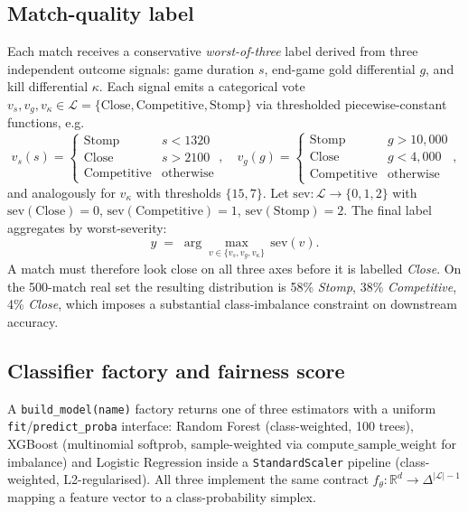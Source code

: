 \documentclass{article}
\begin{document}
\subsection{Match-quality label}
\label{sec:labels}
Each match receives a conservative \emph{worst-of-three} label derived from
three independent outcome signals: game duration $s$, end-game gold
differential $g$, and kill differential $\kappa$. Each signal emits a
categorical vote $v_s, v_g, v_\kappa \in \mathcal{L} =
\{\text{Close}, \text{Competitive}, \text{Stomp}\}$ via thresholded
piecewise-constant functions, e.g.
\begin{equation}
v_s(s) = \begin{cases}
\text{Stomp} & s < 1320 \\
\text{Close} & s > 2100 \\
\text{Competitive} & \text{otherwise}
\end{cases},
\quad
v_g(g) = \begin{cases}
\text{Stomp} & g > 10{,}000 \\
\text{Close} & g < 4{,}000 \\
\text{Competitive} & \text{otherwise}
\end{cases},
\label{eq:votes}
\end{equation}
and analogously for $v_\kappa$ with thresholds $\{15, 7\}$. Let
$\text{sev}: \mathcal{L} \to \{0,1,2\}$ with
$\text{sev}(\text{Close})=0$, $\text{sev}(\text{Competitive})=1$,
$\text{sev}(\text{Stomp})=2$. The final label aggregates by
worst-severity:
\begin{equation}
y \;=\; \arg\max_{v \in \{v_s, v_g, v_\kappa\}}\, \text{sev}(v).
\label{eq:label}
\end{equation}
A match must therefore look close on all three axes before it is labelled
\emph{Close}. On the 500-match real set the resulting distribution is 58\%
\emph{Stomp}, 38\% \emph{Competitive}, 4\% \emph{Close}, which imposes a
substantial class-imbalance constraint on downstream accuracy.

\subsection{Classifier factory and fairness score}
\label{sec:classifier}
A \texttt{build\_model(name)} factory returns one of three estimators with
a uniform \texttt{fit}/\texttt{predict\_proba} interface: Random Forest
(class-weighted, 100 trees), XGBoost (multinomial softprob,
sample-weighted via $\text{compute\_sample\_weight}$ for imbalance) and
Logistic Regression inside a \texttt{StandardScaler} pipeline
(class-weighted, L2-regularised). All three implement the same contract
$f_\theta: \mathbb{R}^d \to \Delta^{|\mathcal{L}|-1}$ mapping a feature
vector to a class-probability simplex.
\end{document}
